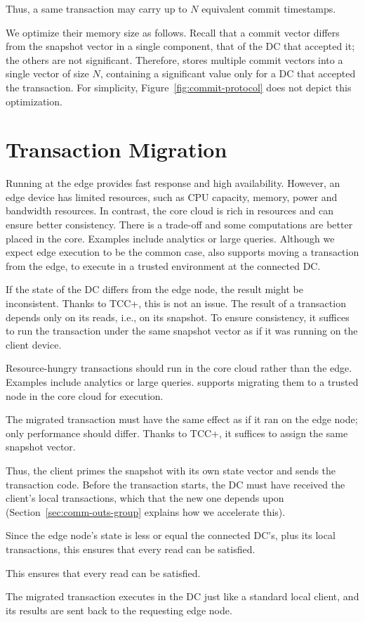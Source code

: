 Thus, a same transaction may carry up to $N$ equivalent commit
timestamps.

We optimize their memory size as follows.
Recall that a commit vector differs from the snapshot vector in a single
component, that of the DC that accepted it; the others
are not significant.
Therefore, \system{} stores multiple commit vectors into a single
vector of size $N$, containing a significant value only for a DC that
accepted the transaction.
For simplicity, Figure~\ref{fig:commit-protocol} does not depict
this optimization.

\section{Transaction Migration}
\label{sec:trans-migr}

Running at the edge provides fast response and high availability.
However, an edge device has limited resources, such as CPU capacity,
memory, power and bandwidth resources.
In contrast, the core cloud is rich in resources and can ensure better
consistency.
There is a trade-off and some computations are better placed in the
core.
Examples include analytics or large queries.
Although we expect edge execution to be the common case, \system{}
also supports moving a transaction from the edge, to execute in a
trusted environment at the connected DC\@.

If the state of the DC differs from the edge node, the result
might be inconsistent.
Thanks to TCC+, this is not an issue.
The result of a transaction depends only on its reads, i.e., on its
snapshot.
To ensure consistency, it suffices to run the transaction under the same
snapshot vector as if it was running on the client device.

Resource-hungry transactions should run in the core cloud rather than
the edge.
Examples include analytics or large queries.
\system{} supports migrating them to a trusted node in the core cloud
for execution.

The migrated transaction must have the same effect as if it ran on the
edge node; only performance should differ.
Thanks to TCC+, it suffices to assign the same snapshot vector.

Thus, the client primes the snapshot with its own state vector and sends
the transaction code.
Before the transaction starts, the DC must have received the client's
local transactions, which that the new one
depends upon (Section~\ref{sec:comm-outs-group} explains how we
accelerate this).

Since the edge node's state is less or equal the connected DC's, plus
its local transactions, this ensures that every read can be satisfied.

This ensures that every read can be satisfied.

The migrated transaction executes in the DC just like a standard local
client, and its results are sent back to the requesting edge node.
